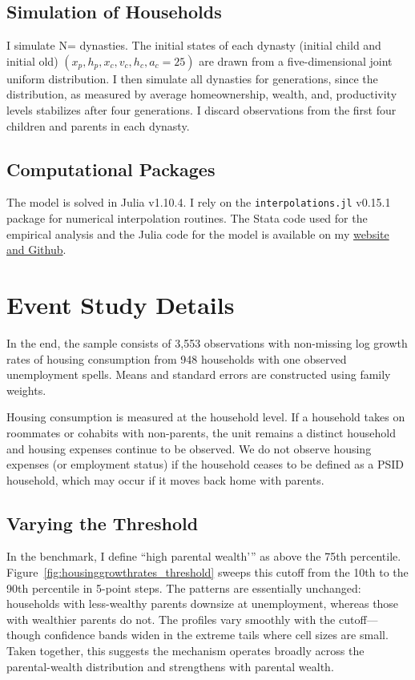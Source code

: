 \documentclass[12pt]{article}
\begin{document}
\subsection{Simulation of Households} 
I simulate N={\parNdyn} dynasties. The initial states of each dynasty (initial child and initial old) $(x_p,h_p,x_c,v_c,h_c,a_c=25)$ are drawn from a five-dimensional joint uniform distribution. I then simulate all dynasties for {\parNdyn} generations, since the distribution, as measured by average homeownership, wealth, and, productivity levels stabilizes after four generations. I discard observations from the first four children and parents in each dynasty.

\subsection{Computational Packages}
The model is solved in Julia v1.10.4. I rely on the \texttt{interpolations.jl} v0.15.1 package for numerical interpolation routines. The Stata code used for the empirical analysis and the Julia code for the model is available on my \href{https://github.com/eirikbrandsaas/HomeownershipBankMomDad.jl}{website and Github}.

\section{Event Study Details}\label{app:eventstudy_details}
In the end, the sample consists of 3,553 observations with non-missing log growth rates of housing consumption from 948 households with one observed unemployment spells. Means and standard errors are constructed using family weights. 

Housing consumption is measured at the household level. If a household takes on roommates or cohabits with non-parents, the unit remains a distinct household and housing expenses continue to be observed.  We do not observe housing expenses (or employment status) if the household ceases to be defined as a PSID household, which may occur if it moves back home with parents.

\subsection{Varying the Threshold}
In the benchmark, I define ``high parental wealth’'' as above the 75th percentile. Figure~\ref{fig:housinggrowthrates_threshold} sweeps this cutoff from the 10th to the 90th percentile in 5-point steps. The patterns are essentially unchanged: households with less-wealthy parents downsize at unemployment, whereas those with wealthier parents do not. The profiles vary smoothly with the cutoff---though confidence bands widen in the extreme tails where cell sizes are small. Taken together, this suggests the mechanism operates broadly across the parental-wealth distribution and strengthens with parental wealth.
\end{document}
